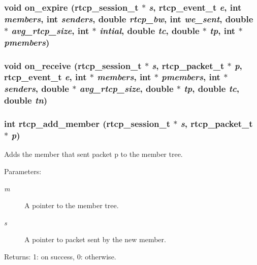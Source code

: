 \subsubsection{\setlength{\rightskip}{0pt plus 5cm}void on\_\-expire ({\bf rtcp\_\-session\_\-t} $\ast$ {\em s}, {\bf rtcp\_\-event\_\-t} {\em e}, int {\em members}, int {\em senders}, double {\em rtcp\_\-bw}, int {\em we\_\-sent}, double $\ast$ {\em avg\_\-rtcp\_\-size}, int $\ast$ {\em intial}, double {\em tc}, double $\ast$ {\em tp}, int $\ast$ {\em pmembers})\hspace{0.3cm}{\tt  [static]}}\label{rtcp_8h_a16}


\subsubsection{\setlength{\rightskip}{0pt plus 5cm}void on\_\-receive ({\bf rtcp\_\-session\_\-t} $\ast$ {\em s}, {\bf rtcp\_\-packet\_\-t} $\ast$ {\em p}, {\bf rtcp\_\-event\_\-t} {\em e}, int $\ast$ {\em members}, int $\ast$ {\em pmembers}, int $\ast$ {\em senders}, double $\ast$ {\em avg\_\-rtcp\_\-size}, double $\ast$ {\em tp}, double {\em tc}, double {\em tn})\hspace{0.3cm}{\tt  [static]}}\label{rtcp_8h_a15}


\subsubsection{\setlength{\rightskip}{0pt plus 5cm}int rtcp\_\-add\_\-member ({\bf rtcp\_\-session\_\-t} $\ast$ {\em s}, {\bf rtcp\_\-packet\_\-t} $\ast$ {\em p})\hspace{0.3cm}{\tt  [static]}}\label{rtcp_8h_a6}


Adds the member that sent packet p to the member tree. \begin{Desc}
\item[Parameters:]
\begin{description}
\item[{\em m}]A pointer to the member tree. \item[{\em s}]A pointer to packet sent by the new member. \end{description}
\end{Desc}
\begin{Desc}
\item[Returns:]1: on success, 0: otherwise. \end{Desc}
